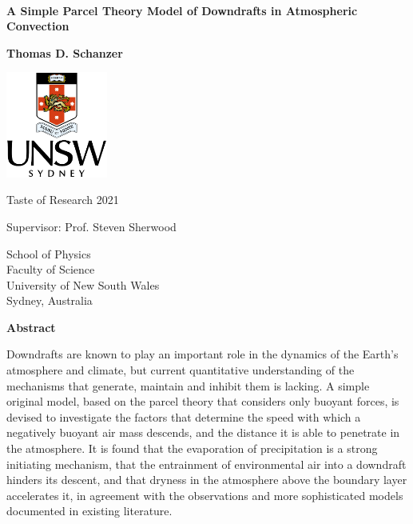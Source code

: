 \documentclass[12pt,titlepage]{article}
\begin{document}
\hypersetup{pageanchor=false}
\begin{titlepage}
    \begin{center}
        ~

        \vspace{3cm}
        \Huge
        \textbf{%
        	A Simple Parcel Theory Model of Downdrafts in Atmospheric
        	Convection}
        
        \vspace{0.75cm}
        \Large
        \textbf{Thomas D. Schanzer}
            
        \vfill
            
        \includegraphics[width=0.25\textwidth]{figures/unsw}

        \vspace{1cm}

        \large    
        Taste of Research 2021

        Supervisor: Prof. Steven Sherwood

        \vspace{1cm}
            
        \large
        School of Physics\\
        Faculty of Science\\
        University of New South Wales\\
        Sydney, Australia\\
    \end{center}
\end{titlepage}

\hypersetup{pageanchor=true}
\addtocounter{page}{1}
\begin{center}
	\large
	\textbf{Abstract}
\end{center}
Downdrafts are known to play an important role in the dynamics of the
Earth's atmosphere and climate, but current quantitative understanding
of the mechanisms that generate, maintain and inhibit them is lacking.
A simple original model, based on the parcel theory that considers
only buoyant forces, is devised to investigate the factors that
determine the speed with which a negatively buoyant air mass descends,
and the distance it is able to penetrate in the atmosphere. It is found
that the evaporation of precipitation is a strong initiating mechanism,
that the entrainment of environmental air into a downdraft hinders
its descent, and that dryness in the atmosphere above the boundary layer
accelerates it, in agreement with the observations and
more sophisticated models documented in existing literature.
\end{document}
